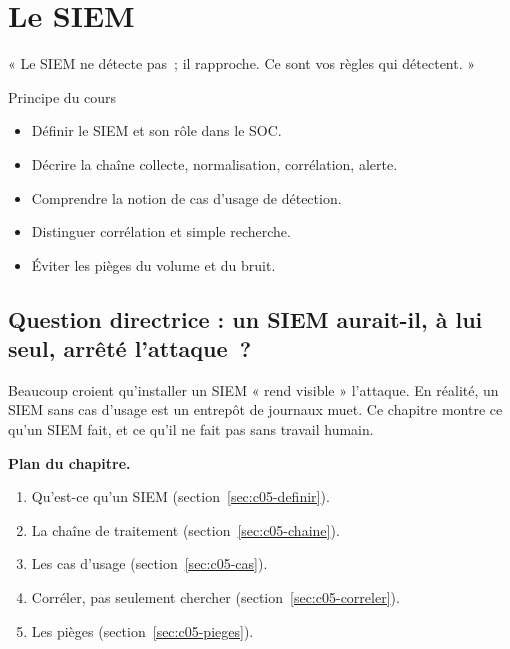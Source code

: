 
\chapter{Le SIEM}
\label{chap:siem}

\epigraph{%
    « Le SIEM ne détecte pas~; il rapproche. Ce sont vos règles qui détectent. »%
}{Principe du cours}


\begin{boxobjectifs}
\begin{itemize}
    \item Définir le SIEM et son rôle dans le SOC.
    \item Décrire la chaîne collecte, normalisation, corrélation, alerte.
    \item Comprendre la notion de cas d'usage de détection.
    \item Distinguer corrélation et simple recherche.
    \item Éviter les pièges du volume et du bruit.
\end{itemize}
\end{boxobjectifs}

\bigskip

\section*{Question directrice : un SIEM aurait-il, à lui seul, arrêté l'attaque~?}

Beaucoup croient qu'installer un SIEM « rend visible » l'attaque. En réalité,
un SIEM sans cas d'usage est un entrepôt de journaux muet. Ce chapitre montre
ce qu'un SIEM fait, et ce qu'il ne fait pas sans travail humain.

\medskip
\textbf{Plan du chapitre.}
\begin{enumerate}
    \item Qu'est-ce qu'un SIEM (section~\ref{sec:c05-definir}).
    \item La chaîne de traitement (section~\ref{sec:c05-chaine}).
    \item Les cas d'usage (section~\ref{sec:c05-cas}).
    \item Corréler, pas seulement chercher (section~\ref{sec:c05-correler}).
    \item Les pièges (section~\ref{sec:c05-pieges}).
\end{enumerate}


